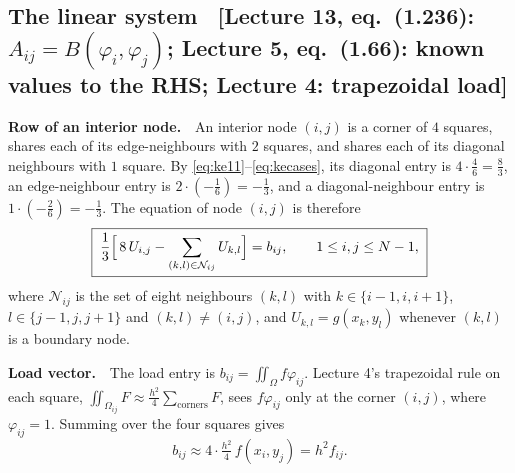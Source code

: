 \documentclass[11pt]{article}
\newcommand{\Om}{\Omega}
\newcommand{\Iint}{\iint_{\Om}}
\newcommand{\src}[1]{{\small\color{black!55}\textsf{[#1]}}}
\begin{document}
\subsection*{The linear system
  \ \src{Lecture 13, eq.~(1.236): $A_{ij}=B(\varphi_{i},\varphi_{j})$;
         Lecture 5, eq.~(1.66): known values to the RHS; Lecture 4: trapezoidal load}}

\textbf{Row of an interior node.}\ \ An interior node $(i,j)$ is a corner of
$4$ squares, shares each of its edge-neighbours with $2$ squares, and shares
each of its diagonal neighbours with $1$ square.  By \eqref{eq:ke11}--\eqref{eq:kecases}, its
diagonal entry is $4\cdot\tfrac46=\tfrac83$, an edge-neighbour entry is
$2\cdot(-\tfrac16)=-\tfrac13$, and a diagonal-neighbour entry is
$1\cdot(-\tfrac26)=-\tfrac13$.  The equation of node $(i,j)$ is therefore
\begin{equation}\label{eq:row}
  \boxed{\;\frac13\Bigl[\,8\,U_{i,j}-\sum_{(k,l)\in\mathcal{N}_{ij}}U_{k,l}\Bigr]=b_{ij},
  \qquad 1\le i,j\le N-1,\;}
\end{equation}
where $\mathcal{N}_{ij}$ is the set of eight neighbours $(k,l)$ with
$k\in\{i-1,i,i+1\}$, $l\in\{j-1,j,j+1\}$ and $(k,l)\neq(i,j)$, and
$U_{k,l}=g(x_{k},y_{l})$ whenever $(k,l)$ is a boundary node.

\textbf{Load vector.}\ \ The load entry is $b_{ij}=\Iint f\varphi_{ij}$.
Lecture 4's trapezoidal rule on each square,
$\iint_{\Om_{ij}}F\approx\tfrac{h^{2}}{4}\sum_{\text{corners}}F$, sees
$f\varphi_{ij}$ only at the corner $(i,j)$, where $\varphi_{ij}=1$.  Summing
over the four squares gives
\begin{equation}\label{eq:load}
  b_{ij}\approx4\cdot\tfrac{h^{2}}{4}\,f(x_{i},y_{j})=h^{2}f_{ij} .
\end{equation}
\end{document}
